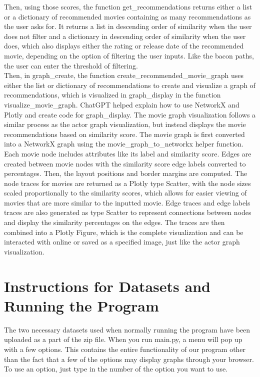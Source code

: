 \documentclass{article}
\begin{document}
Then, using those scores, the function get\_recommendations returns either a list or a dictionary of recommended movies containing as many recommendations as the user asks for. It returns a list in descending order of similarity when the user does not filter and a dictionary in descending order of similarity when the user does, which also displays either the rating or release date of the recommended movie, depending on the option of filtering the user inputs. Like the bacon paths, the user can enter the threshold of filtering. \\

Then, in graph\_create, the function create\_recommended\_movie\_graph uses either the list or dictionary of recommendations to create and visualize a graph of recommendations, which is visualized in graph\_display in the function visualize\_movie\_graph. ChatGPT helped explain how to use NetworkX and Plotly and create code for graph\_display. The movie graph visualization follows a similar process as the actor graph visualization, but instead displays the movie recommendations based on similarity score. The movie graph is first converted into a NetworkX graph using the movie\_graph\_to\_networkx helper function. Each movie node includes attributes like its label and similarity score. Edges are created between movie nodes with the similarity score edge labels converted to percentages. Then, the layout positions and border margins are computed. The node traces for movies are returned as a Plotly type Scatter, with the node sizes scaled proportionally to the similarity scores, which allows for easier viewing of movies that are more similar to the inputted movie. Edge traces and edge labels traces are also generated as type Scatter to represent connections between nodes and display the similarity percentages on the edges. The traces are then combined into a Plotly Figure, which is the complete visualization and can be interacted with online or saved as a specified image, just like the actor graph visualization.
 \\

\section*{Instructions for Datasets and Running the Program}
The two necessary datasets used when normally running the program have been uploaded as a part of the zip file. When you run main.py, a menu will pop up with a few options. This contains the entire functionality of our program other than the fact that a few of the options may display graphs through your browser. To use an option, just type in the number of the option you want to use.\\
\end{document}
